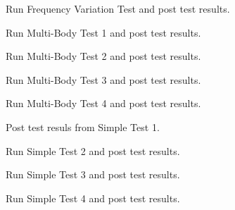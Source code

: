
\begin{DoxyRefList}
\item[\label{test__test000009}%
\hypertarget{test__test000009}{}%
Page \hyperlink{_test_frequency}{Frequency Variation Test} ]Run Frequency Variation Test and post test results. 
\item[\label{test__test000001}%
\hypertarget{test__test000001}{}%
Page \hyperlink{_multi_body_test1}{Multi-\/body Test 1} ]Run Multi-\/\-Body Test 1 and post test results. 
\item[\label{test__test000002}%
\hypertarget{test__test000002}{}%
Page \hyperlink{_multi_body_test2}{Multi-\/body Test 2} ]Run Multi-\/\-Body Test 2 and post test results. 
\item[\label{test__test000003}%
\hypertarget{test__test000003}{}%
Page \hyperlink{_multi_body_test3}{Multi-\/body Test 3} ]Run Multi-\/\-Body Test 3 and post test results. 
\item[\label{test__test000004}%
\hypertarget{test__test000004}{}%
Page \hyperlink{_multi_body_test4}{Multi-\/body Test 4} ]Run Multi-\/\-Body Test 4 and post test results. 
\item[\label{test__test000005}%
\hypertarget{test__test000005}{}%
Page \hyperlink{_simple_test1}{Simple Test 1} ]Post test resuls from Simple Test 1. 
\item[\label{test__test000006}%
\hypertarget{test__test000006}{}%
Page \hyperlink{_simple_test2}{Simple Test 2} ]Run Simple Test 2 and post test results. 
\item[\label{test__test000007}%
\hypertarget{test__test000007}{}%
Page \hyperlink{_simple_test3}{Simple Test 3} ]Run Simple Test 3 and post test results. 
\item[\label{test__test000008}%
\hypertarget{test__test000008}{}%
Page \hyperlink{_simple_test4}{Simple Test 4} ]Run Simple Test 4 and post test results.
\end{DoxyRefList}